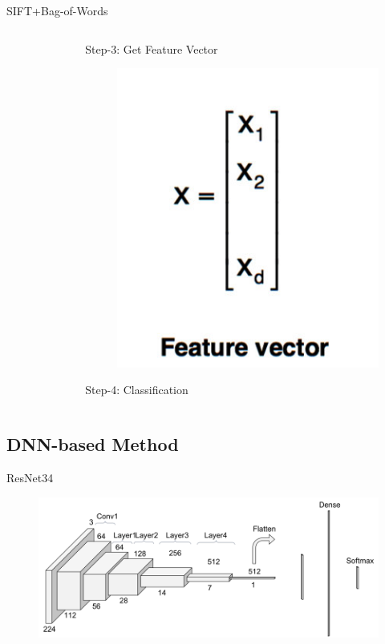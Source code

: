 \documentclass[unknownkeysallowed]{beamer}
\begin{document}
\begin{frame}{SIFT+Bag-of-Words\cite{al2016facial,hosmer2013applied}}
\begin{columns}
\begin{column}{0.45\paperwidth}
\begin{figure}
	\end{figure}
	\end{column}
	\begin{column}{0.45\paperwidth}
	Step-3: Get Feature Vector\\
	\begin{figure}\includegraphics[width=0.2\paperwidth,height=0.3\paperheight]{images/feature_vector}
	\end{figure}
	Step-4: Classification
	\end{column}
	\end{columns}
	\end{frame}
	\subsection{DNN-based Method}
	\begin{frame}
		\begin{block}{ResNet34\cite{he2016deep}}
		\begin{figure}
			\includegraphics[width=0.8\paperwidth,height=0.4\paperheight]{images/resnet_framework}
		\end{figure}
	\end{block}
	\end{frame}
\end{document}
